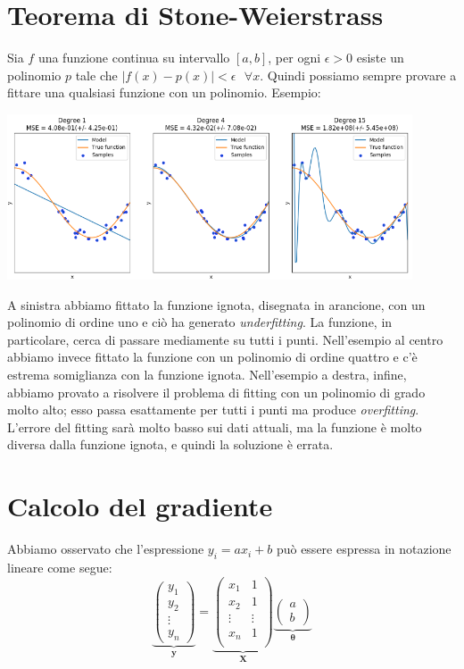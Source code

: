 \documentclass{article}
\begin{document}
        \section{Teorema di Stone-Weierstrass}
            Sia $f$ una funzione continua su intervallo $[a,b]$, per ogni $\epsilon > 0$ esiste un polinomio $p$ tale che 
            $|f(x) - p(x)|<\epsilon \text{ } \forall x$. Quindi possiamo sempre provare a fittare una qualsiasi funzione con un polinomio.
            Esempio:
            \begin{center}\includegraphics[width=12cm]{stone_weier.png}\end{center}
            A sinistra abbiamo fittato la funzione ignota, disegnata in arancione, con un polinomio di ordine uno e ciò ha generato \emph{underfitting}. La funzione, in particolare,
            cerca di passare mediamente su tutti i punti. Nell'esempio al centro abbiamo invece fittato la funzione con un polinomio di ordine quattro e 
            c'è estrema somiglianza con la funzione ignota. Nell'esempio a destra, infine, abbiamo provato a risolvere il problema 
            di fitting con un polinomio di grado molto alto; esso passa esattamente per tutti i punti ma produce \emph{overfitting}. 
            L'errore del fitting sarà molto basso sui dati attuali, ma la funzione è molto diversa dalla funzione ignota, e quindi la 
            soluzione è errata.
        
        \section{Calcolo del gradiente}
            Abbiamo osservato che l'espressione $y_i = ax_i+b$ può essere espressa in notazione lineare come segue:
            \[ \underbrace{\begin{pmatrix}
                y_1 \\
                y_2 \\
                \vdots \\
                y_n
            \end{pmatrix}}_\mathbf{y} = \underbrace{\begin{pmatrix}
                x_1 & 1 \\
                x_2 & 1 \\
                \vdots & \vdots \\
                x_n & 1 \\
            \end{pmatrix}}_\mathbf{X} \underbrace{\begin{pmatrix}
                a \\
                b
            \end{pmatrix}}_\mathbf{\theta}\]
\end{document}
